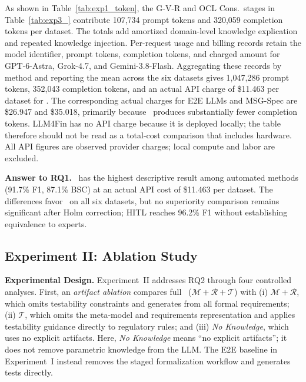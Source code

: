 As shown in Table~\ref{tab:exp1_token}, the G-V-R and OCL Cons.\ stages in
Table~\ref{tab:exp3_} contribute 107,734 prompt tokens and 320,059 completion
tokens per dataset. The totals add amortized domain-level knowledge explication
and repeated knowledge injection. Per-request usage and billing records retain
the model identifier, prompt tokens, completion tokens, and charged amount for
GPT-6-Astra, Grok-4.7, and Gemini-3.8-Flash. Aggregating these records by method
and reporting the mean across the six datasets gives 1,047,286 prompt tokens,
352,043 completion tokens, and an actual API charge of \$11.463 per dataset for
\ourtool. The corresponding actual charges for E2E LLMs and MSG-Spec are
\$26.947 and \$35.018,
primarily because \ourtool\ produces substantially fewer completion tokens.
LLM4Fin has no API charge because it is deployed locally; the table therefore
should not be read as a total-cost comparison that includes hardware. All API
figures are observed provider charges; local compute and labor are excluded.


\noindent\textbf{Answer to RQ1.}
\ourtool\ has the highest descriptive result among automated methods
(91.7\% F1, 87.1\% BSC) at an actual API cost of \$11.463 per dataset. The differences favor
\ourtool\ on all six datasets, but no superiority comparison remains
significant after Holm correction; HITL reaches 96.2\% F1 without establishing
equivalence to experts.






\subsection{Experiment II: Ablation Study}
\label{sec:exp2}

\noindent
\textbf{Experimental Design.}
Experiment~II addresses RQ2 through four controlled analyses.
First, an \emph{artifact ablation} compares full \ourtool\
($\mathcal{M}{+}\mathcal{R}{+}\mathcal{T}$) with
(i) $\mathcal{M}{+}\mathcal{R}$, which omits testability constraints and
generates from all formal requirements; (ii) $\mathcal{T}$, which omits the
meta-model and requirements representation and applies testability guidance
directly to regulatory rules; and (iii) \textit{No Knowledge}, which uses no
explicit artifacts.
Here, \textit{No Knowledge} means ``no explicit artifacts''; it does not
remove parametric knowledge from the LLM. The E2E baseline in Experiment~I
instead removes the staged formalization workflow and generates tests directly.

